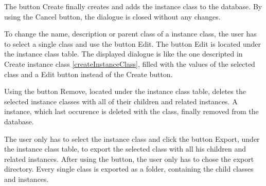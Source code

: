 The button Create finally creates and adds the instance class to the database. By using the Cancel button, the dialogue is closed without any changes.

 To change the name, description or parent class of a instance class, the user has to select a single class and use the button Edit. The button Edit is located under the instance class table. The displayed dialogue is like the one descripted in Create instance class \ref{createInstanceClass}, filled with the values of the selected class and a Edit button instead of the Create button.

 Using the button Remove, located under the instance class table, deletes the selected instance classes with all of their children and related instances. A instance, which last occurence is deleted with the class, finally removed from the database.

 The user only has to select the instance class and click the button Export, under the instance class table, to export the selected class with all his children and related instances. After using the button, the user only has to chose the export directory. Every single class is exported as a folder, containing the child classes and instances.

